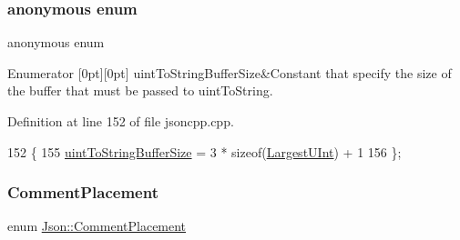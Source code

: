 \subsubsection{\texorpdfstring{anonymous enum}{anonymous enum}}
{\footnotesize\ttfamily anonymous enum}

\begin{DoxyEnumFields}{Enumerator}
[0pt][0pt]{}\mbox{\label{namespace_json_a2aacab54ef6fc18e833fbd4982a0a23aae4f2008c7919f20d81286121d1374424}} 
uint\+To\+String\+Buffer\+Size&Constant that specify the size of the buffer that must be passed to uint\+To\+String. \\
\hline

\end{DoxyEnumFields}


Definition at line 152 of file jsoncpp.\+cpp.


\begin{DoxyCode}
152      \{
155   \hyperlink{namespace_json_a2aacab54ef6fc18e833fbd4982a0a23aae4f2008c7919f20d81286121d1374424}{uintToStringBufferSize} = 3 * \textcolor{keyword}{sizeof}(\hyperlink{namespace_json_ae202ecad69725e23443f465e257456d0}{LargestUInt}) + 1
156 \};
\end{DoxyCode}
\mbox{\label{namespace_json_a4fc417c23905b2ae9e2c47d197a45351}} 
\subsubsection{\texorpdfstring{Comment\+Placement}{CommentPlacement}}
{\footnotesize\ttfamily enum \hyperlink{namespace_json_a4fc417c23905b2ae9e2c47d197a45351}{Json\+::\+Comment\+Placement}}


